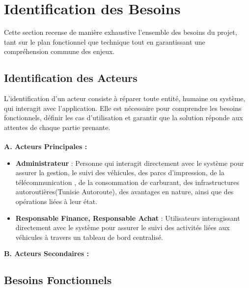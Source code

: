\documentclass[a4paper,11pt]{report}
\begin{document}
\section{Identification des Besoins}
Cette section  recense de manière exhaustive l'ensemble des besoins du projet, tant sur le plan fonctionnel que technique tout en garantissant une compréhension commune des enjeux.

\subsection{Identification des Acteurs}
L'identification d'un acteur consiste à réparer toute entité, humaine ou système, qui interagit avec l'application. Elle est nécessaire pour comprendre les besoins fonctionnels, définir les cas d'utilisation et garantir que la solution réponde aux attentes de chaque partie prenante.
\\
\\
\textbf{A. Acteurs Principales : }
\begin{itemize}
	\item \textbf{Administrateur} : Personne qui interagit directement avec le système pour assurer la gestion, le suivi des véhicules, des parcs d'impression, de la télécommunication , de la consommation de carburant, des infrastructures autoroutières(Tunisie Autoroute), des avantages en nature, ainsi que des opérations liées à leur état.
	\item \textbf{Responsable Finance, Responsable Achat} : Utilisateurs interagissant directement avec le système pour assurer le suivi des activités liées aux véhicules à travers un tableau de bord centralisé.
\end{itemize}
\textbf{B. Acteurs Secondaires : }\\

\newpage



\subsection{Besoins Fonctionnels}
\end{document}
